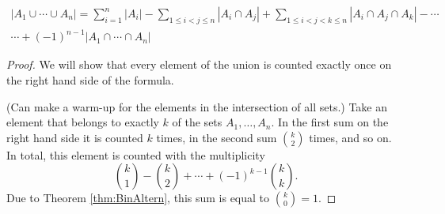 \begin{page}
\setcounter{section}{5}
\setcounter{subsection}{1}
\setcounter{dfn}{1}
\label{portion:126}

\begin{thm}
\label{thm:IncExc}
\begin{multline*}
|A_1 \cup \cdots \cup A_n| = \sum_{i=1}^n |A_i| - \sum_{1 \le i < j \le n} |A_i \cap A_j| 
+ \sum_{1 \le i < j < k \le n} |A_i \cap A_j \cap A_k| - \cdots \\
\cdots +(-1)^{n-1} |A_1 \cap \cdots \cap A_n|
\end{multline*}
\end{thm}

\end{page}

\begin{page}
\setcounter{section}{5}
\setcounter{subsection}{1}
\setcounter{dfn}{1}
\label{portion:127}

\begin{proof}
We will show that every element of the union is counted exactly once on the right hand side of the formula.

(Can make a warm-up for the elements in the intersection of all sets.)
Take an element that belongs to exactly $k$ of the sets $A_1, \ldots, A_n$.
In the first sum on the right hand side it is counted $k$ times,
in the second sum $\binom{k}{2}$ times, and so on.
In total, this element is counted with the multiplicity
\[
\binom{k}{1} - \binom{k}{2} + \cdots + (-1)^{k-1}\binom{k}{k}.
\]
Due to Theorem \ref{thm:BinAltern}, this sum is equal to $\binom{k}{0} = 1$.
\end{proof}


\end{page}


